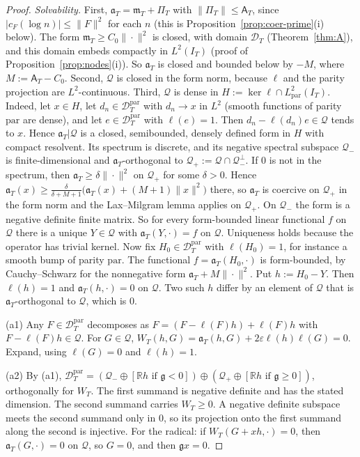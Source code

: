 \documentclass[11pt]{amsart}
\theoremstyle{definition}
\theoremstyle{remark}
\newcommand{\R}{\mathbb R}
\newcommand{\IT}{I_T}
\newcommand{\cF}{c_F}
\newcommand{\Aconst}{\mathsf A_T}
\newcommand{\PiT}{\Pi_T}
\newcommand{\mT}{\mathfrak m_T}
\begin{document}
\begin{proof}
\emph{Solvability.} First, $\mathfrak a_T=\mT+\PiT$ with $\|\PiT\|\le\Aconst$, since $|\cF(\log n)|\le\|F\|^2$ for each $n$ (this is Proposition~\ref{prop:coer-prime}(i) below). The form
$\mT\ge C_0\|\cdot\|^2$ is closed, with domain $\mathcal D_T$ (Theorem~\ref{thm:A}), and this domain embeds
compactly in $L^2(\IT)$ (proof of Proposition~\ref{prop:nodes}(i)). So $\mathfrak a_T$ is closed and bounded
below by $-M$, where $M:=\Aconst-C_0$. Second, $\mathcal Q$ is closed in the form norm, because $\ell$ and the
parity projection are $L^2$-continuous. Third, $\mathcal Q$ is dense in
$H:=\ker\ell\cap L^2_{\mathrm{par}}(\IT)$. Indeed, let $x\in H$, let $d_n\in\mathcal D^{\mathrm{par}}_T$ with $d_n\to x$ in
$L^2$ (smooth functions of parity $\mathrm{par}$ are dense), and let $e\in\mathcal D^{\mathrm{par}}_T$ with $\ell(e)=1$.
Then $d_n-\ell(d_n)e\in\mathcal Q$ tends to $x$. Hence $\mathfrak a_T|\mathcal Q$ is a closed, semibounded, densely
defined form in $H$ with compact resolvent. Its spectrum is discrete, and its negative spectral subspace
$\mathcal Q_-$ is finite-dimensional and $\mathfrak a_T$-orthogonal to $\mathcal Q_+:=\mathcal Q\cap\mathcal Q_-^\perp$. If
$0$ is not in the spectrum, then $\mathfrak a_T\ge\delta\|\cdot\|^2$ on $\mathcal Q_+$ for some $\delta>0$. Hence
$\mathfrak a_T(x)\ge\frac{\delta}{\delta+M+1}\big(\mathfrak a_T(x)+(M+1)\|x\|^2\big)$ there, so $\mathfrak a_T$ is coercive
on $\mathcal Q_+$ in the form norm and the Lax--Milgram lemma applies on $\mathcal Q_+$. On $\mathcal Q_-$ the form is a
negative definite finite matrix. So for every form-bounded linear functional $f$ on $\mathcal Q$ there is a unique
$Y\in\mathcal Q$ with $\mathfrak a_T(Y,\cdot)=f$ on $\mathcal Q$. Uniqueness holds because the operator has trivial
kernel. Now fix $H_0\in\mathcal D^{\mathrm{par}}_T$ with $\ell(H_0)=1$, for instance a smooth bump of parity
$\mathrm{par}$. The functional $f=\mathfrak a_T(H_0,\cdot)$ is form-bounded, by Cauchy--Schwarz for the nonnegative
form $\mathfrak a_T+M\|\cdot\|^2$. Put $h:=H_0-Y$. Then $\ell(h)=1$ and $\mathfrak a_T(h,\cdot)=0$ on $\mathcal Q$. Two such
$h$ differ by an element of $\mathcal Q$ that is $\mathfrak a_T$-orthogonal to $\mathcal Q$, which is $0$.

(a1) Any $F\in\mathcal D^{\mathrm{par}}_T$ decomposes as $F=(F-\ell(F)h)+\ell(F)h$ with $F-\ell(F)h\in\mathcal Q$. For
$G\in\mathcal Q$, $W_T(h,G)=\mathfrak a_T(h,G)+2\varepsilon\ell(h)\ell(G)=0$. Expand, using $\ell(G)=0$ and $\ell(h)=1$.

(a2) By (a1), $\mathcal D^{\mathrm{par}}_T=(\mathcal Q_-\oplus[\R h\text{ if }\mathfrak g<0])\oplus(\mathcal Q_+\oplus[\R h\text{ if }\mathfrak g\ge0])$,
orthogonally for $W_T$. The first summand is negative definite and has the stated dimension. The second
summand carries $W_T\ge0$. A negative definite subspace meets the second summand only in $0$, so its
projection onto the first summand along the second is injective. For the radical: if
$W_T(G+xh,\cdot)=0$, then $\mathfrak a_T(G,\cdot)=0$ on $\mathcal Q$, so $G=0$, and then $\mathfrak g x=0$.


\end{proof}
\end{document}
